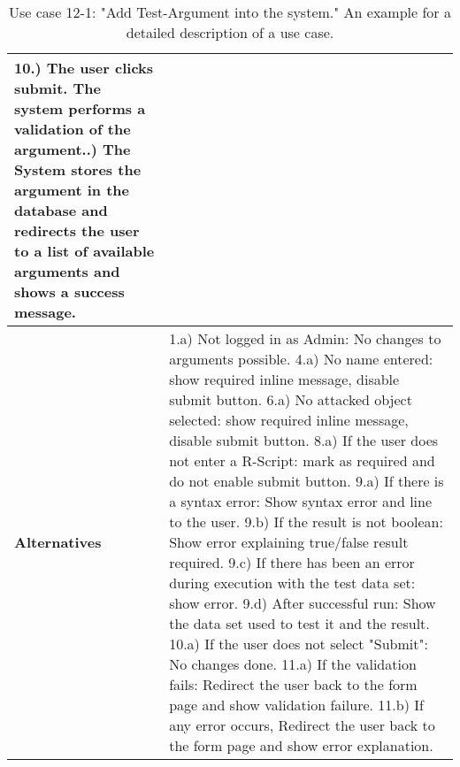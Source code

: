 \begin{table}[h]
{\begin{tabular}{|p{1.5cm} p{11.5cm}|}
				10.) The user clicks submit. The system performs a validation of the argument.\newline
				11.) The System stores the argument in the database and redirects the user to a list of available arguments and shows a success message.
		\\
		\hline
			\textbf{Alternatives} & 
							1.a) Not logged in as Admin: No changes to arguments possible.
				\newline	4.a) No name entered: show required inline message, disable submit button.
				\newline	6.a) No attacked object selected: show required inline message, disable submit button.
				\newline	8.a) If the user does not enter a R-Script: mark as required and do not enable submit button.
				\newline	9.a) If there is a syntax error: Show syntax error and line to the user.
				\newline	9.b) If the result is not boolean: Show error explaining true/false result required.
				\newline	9.c) If there has been an error during execution with the test data set: show error.
				\newline	9.d) After successful run: Show the data set used to test it and the result.
				\newline	10.a) If the user does not select "Submit": No changes done.
				\newline	11.a) If the validation fails: Redirect the user back to the form page and show validation failure.
				\newline	11.b) If any error occurs,  Redirect the user back to the form page and show error explanation.
							\\
		\hline

\end{tabular}
}
\label{uc:12-1}\\
\caption{Use case 12-1: "Add Test-Argument into the system." An example for a detailed description of a use case.}
\end{table}
